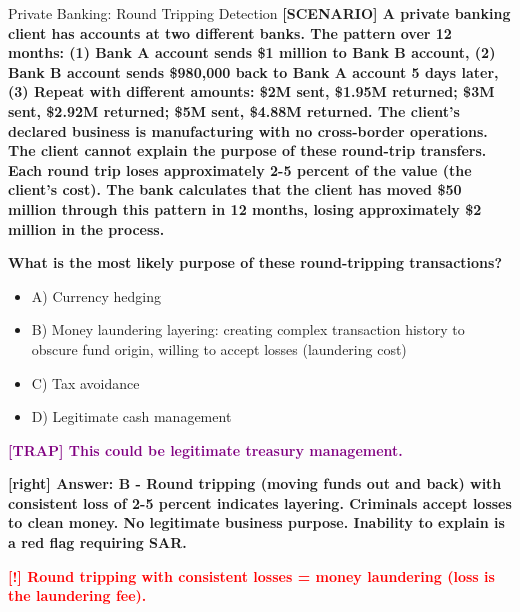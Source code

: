\documentclass[11pt,a4paper]{beamer}
\newcommand{\redflag}[1]{\textcolor{red}{\textbf{[!] #1}}}
\newcommand{\trap}[1]{\textcolor{purple}{\textbf{[TRAP] #1}}}
\newcommand{\correct}[1]{\textcolor{green!50!black}{\textbf{[right] #1}}}
\newcommand{\scenario}[1]{\textcolor{blue!70!black}{\textbf{[SCENARIO] #1}}}
\begin{document}
	
	\begin{frame}{Private Banking: Round Tripping Detection}
		\tiny
		\scenario{A private banking client has accounts at two different banks. The pattern over 12 months: (1) Bank A account sends \$1 million to Bank B account, (2) Bank B account sends \$980,000 back to Bank A account 5 days later, (3) Repeat with different amounts: \$2M sent, \$1.95M returned; \$3M sent, \$2.92M returned; \$5M sent, \$4.88M returned. The client's declared business is manufacturing with no cross-border operations. The client cannot explain the purpose of these round-trip transfers. Each round trip loses approximately 2-5 percent of the value (the client's cost). The bank calculates that the client has moved \$50 million through this pattern in 12 months, losing approximately \$2 million in the process.}
		
		\vspace{0.02cm}
		\textbf{What is the most likely purpose of these round-tripping transactions?}
		\vspace{0.02cm}
		
		\begin{itemize}
			\item A) Currency hedging
			\item B) Money laundering layering: creating complex transaction history to obscure fund origin, willing to accept losses (laundering cost)
			\item C) Tax avoidance
			\item D) Legitimate cash management
		\end{itemize}
		
		\vspace{0.02cm}
		\trap{This could be legitimate treasury management.}
		
		\vspace{0.02cm}
		\correct{Answer: B - Round tripping (moving funds out and back) with consistent loss of 2-5 percent indicates layering. Criminals accept losses to clean money. No legitimate business purpose. Inability to explain is a red flag requiring SAR.}
		
		\vspace{0.02cm}
		\redflag{Round tripping with consistent losses = money laundering (loss is the laundering fee).}
	\end{frame}
	
\end{document}

